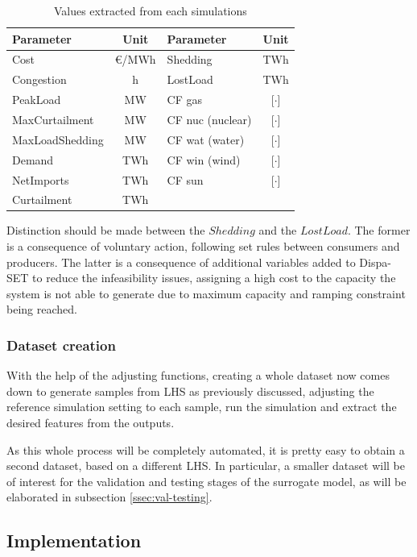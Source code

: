 \begin{table}[h]
    \centering
    \begin{tabular}{|l c|l c|}
		\hline
		Parameter & Unit & Parameter & Unit \\
		\hline
		Cost            & €/MWh & Shedding & TWh \\
		Congestion      & h     & LostLoad & TWh \\
		PeakLoad        & MW    & CF gas  & [$\cdot$] \\
		MaxCurtailment  & MW    & CF nuc (nuclear)  & [$\cdot$] \\
		MaxLoadShedding & MW    & CF wat (water)  & [$\cdot$] \\
		Demand          & TWh   & CF win (wind)  & [$\cdot$] \\
		NetImports      & TWh   & CF sun  & [$\cdot$] \\
		Curtailment     & TWh   &  &  \\
		\hline
	\end{tabular}
	\caption{Values extracted from each simulations}
	\label{table:values-extracted}
\end{table}

Distinction should be made between the $Shedding$ and the $LostLoad$. The former is a consequence of voluntary action, following set rules between consumers and producers. The latter is a consequence of additional variables added to Dispa-SET to reduce the infeasibility issues, assigning a high cost to the capacity the system is not able to generate due to maximum capacity and ramping constraint being reached.

\subsubsection{Dataset creation}

With the help of the adjusting functions, creating a whole dataset now comes down to generate samples from LHS as previously discussed, adjusting the reference simulation setting to each sample, run the simulation and extract the desired features from the outputs.

As this whole process will be completely automated, it is pretty easy to obtain a second dataset, based on a different LHS. In particular, a smaller dataset will be of interest for the validation and testing stages of the surrogate model, as will be elaborated in subsection \ref{ssec:val-testing}.

\subsection{Implementation}

